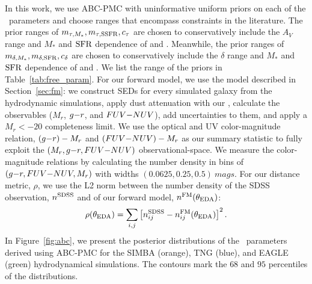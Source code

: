 In this work, we use ABC-PMC with uninformative uniform priors on each of
the \eda~parameters and choose ranges that encompass constraints in the
literature.
The prior ranges of $m_{\tau,M_*}, m_{\tau,{\rm SSFR}}, c_\tau$ are chosen to
conservatively include the $A_V$ range and $M_*$ and ${\rm SFR}$ dependence of
\cite{narayanan2018} and \cite{salim2020}. Meanwhile, the prior ranges of 
$m_{\delta,M_*}, m_{\delta,{\rm SFR}}, c_\delta$ are chosen to conservatively include the $\delta$
range and $M_*$ and ${\rm SFR}$ dependence of \cite{leja2017} and \cite{salim2018}. 
We list the range of the priors in Table~\ref{tab:free_param}. 
For our forward model, we use the model described in
Section~\ref{sec:fm}: we construct SEDs for every simulated galaxy from
the hydrodynamic simulations, apply dust attenuation with our
\eda, calculate the observables ($M_r$, $g{-}r$, and $FUV{-}NUV$),
add uncertainties to them, and apply a $M_r < -20$ completeness 
limit. 
We use the optical and UV color-magnitude relation, $(g{-}r)- M_r$ and
$(FUV{-}NUV)-M_r$ as our summary statistic to fully exploit the $(M_r, g{-}r,
FUV{-}NUV)$ observational-space. We measure the color-magnitude relations by
calculating the number density in bins of $(g{-}r, FUV{-}NUV, M_r)$ with widths
$(0.0625, 0.25, 0.5)~mags$. For our distance metric, $\rho$, we use the L2
norm between the number density of the SDSS observation, $n^{\rm SDSS}$ and
of our forward model, $n^{\rm FM}(\theta_{\rm EDA})$: 
\begin{equation} \label{eq:distance}
    \rho(\theta_{\rm \eda}) = \sum\limits_{i,j} \left[n_{ij}^{\rm SDSS} -
    n_{ij}^{\rm FM}(\theta_{\rm \eda}) \right]^2.
\end{equation}
In Figure~\ref{fig:abc}, we present the posterior distributions of the \eda~parameters
derived using ABC-PMC for the SIMBA (orange), TNG (blue), and EAGLE (green) hydrodynamical 
simulations. The contours mark the $68$ and $95$ percentiles of the distributions. 
